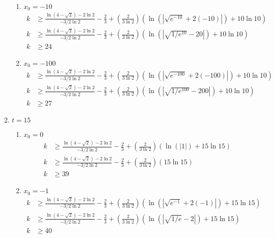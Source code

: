 \documentclass{article}
\begin{document}
\begin{enumerate}
\begin{enumerate}
            \item $x_0 = -10$
            \begin{align*}
                k &\geq \frac{\ln(4 - \sqrt{2}) - 2\ln 2}{-3/2 \ln 2} - \frac{2}{3} +
                \left(\frac{2}{3\ln 2}\right)(\ln(|\sqrt{e^{-10}} + 2(-10)|) + 10 \ln 10)\\
                k &\geq \frac{\ln(4 - \sqrt{2}) - 2\ln 2}{-3/2 \ln 2} - \frac{2}{3} +
                \left(\frac{2}{3\ln 2}\right)(\ln(|\sqrt{1/e^{10}} - 20|) + 10 \ln 10)\\
                k & \geq 24
            \end{align*}
            \item $x_0 = -100$
            \begin{align*}
                k &\geq \frac{\ln(4 - \sqrt{2}) - 2\ln 2}{-3/2 \ln 2} - \frac{2}{3} +
                \left(\frac{2}{3\ln 2}\right)(\ln(|\sqrt{e^{-100}} + 2(-100)|) + 10 \ln 10)\\
                k &\geq \frac{\ln(4 - \sqrt{2}) - 2\ln 2}{-3/2 \ln 2} - \frac{2}{3} +
                \left(\frac{2}{3\ln 2}\right)(\ln(|\sqrt{1/e^{100}} - 200|) + 10 \ln 10)\\
                k & \geq 27
            \end{align*}
        \end{enumerate}
        \item $t = 15$
        \begin{enumerate}
            \item $x_0 = 0$
            \begin{align*}
                k &\geq \frac{\ln(4 - \sqrt{2}) - 2\ln 2}{-3/2 \ln 2} - \frac{2}{3} +
                \left(\frac{2}{3\ln 2}\right)(\ln(|1|) + 15 \ln 15)\\
                k &\geq \frac{\ln(4 - \sqrt{2}) - 2\ln 2}{-3/2 \ln 2} - \frac{2}{3} +
                \left(\frac{2}{3\ln 2}\right)(15 \ln 15)\\
                k & \geq 39
            \end{align*}

            \item $x_0 = -1$
            \begin{align*}
                k &\geq \frac{\ln(4 - \sqrt{2}) - 2\ln 2}{-3/2 \ln 2} - \frac{2}{3} +
                \left(\frac{2}{3\ln 2}\right)(\ln(|\sqrt{e^{-1}} + 2(-1)|) + 15 \ln 15)\\
                k &\geq \frac{\ln(4 - \sqrt{2}) - 2\ln 2}{-3/2 \ln 2} - \frac{2}{3} +
                \left(\frac{2}{3\ln 2}\right)(\ln(|\sqrt{1/e} - 2|) + 15 \ln 15)\\
                k & \geq 40
            \end{align*}


\end{enumerate}
\end{enumerate}
\end{document}
